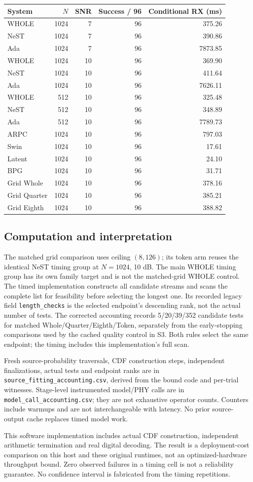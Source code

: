 \documentclass[10pt,letterpaper]{article}
\begin{document}
\begin{longtable}{@{}lrrrr@{}}\toprule
System & $N$ & SNR & Success / 96 & Conditional RX (ms)\\\midrule\endhead
WHOLE & 1024 & 7 & 96 & 375.26\\
NeST & 1024 & 7 & 96 & 390.86\\
Ada & 1024 & 7 & 96 & 7873.85\\
WHOLE & 1024 & 10 & 96 & 369.90\\
NeST & 1024 & 10 & 96 & 411.64\\
Ada & 1024 & 10 & 96 & 7626.11\\
WHOLE & 512 & 10 & 96 & 325.48\\
NeST & 512 & 10 & 96 & 348.89\\
Ada & 512 & 10 & 96 & 7789.73\\
ARPC & 1024 & 10 & 96 & 797.03\\
Swin & 1024 & 10 & 96 & 17.61\\
Latent & 1024 & 10 & 96 & 24.10\\
BPG & 1024 & 10 & 96 & 31.71\\
Grid Whole & 1024 & 10 & 96 & 378.16\\
Grid Quarter & 1024 & 10 & 96 & 385.21\\
Grid Eighth & 1024 & 10 & 96 & 388.82\\
\bottomrule\end{longtable}
\subsection{Computation and interpretation}
The matched grid comparison uses ceiling $(8,126)$; its token arm reuses the identical NeST timing group at $N=1024$, 10 dB. The main WHOLE timing group has its own family target and is not the matched-grid WHOLE control. The timed implementation constructs all candidate streams and scans the complete list for feasibility before selecting the longest one. Its recorded legacy field \texttt{length\_checks} is the selected endpoint's descending rank, not the actual number of tests. The corrected accounting records 5/20/39/352 candidate tests for matched Whole/Quarter/Eighth/Token, separately from the early-stopping comparisons used by the cached quality control in S3. Both rules select the same endpoint; the timing includes this implementation's full scan.

Fresh source-probability traversals, CDF construction steps, independent finalizations, actual tests and endpoint ranks are in \texttt{source\_fitting\_accounting.csv}, derived from the bound code and per-trial witnesses. Stage-level instrumented model/PHY calls are in \texttt{model\_call\_accounting.csv}; they are not exhaustive operator counts. Counters include warmups and are not interchangeable with latency. No prior source-output cache replaces timed model work.

This software implementation includes actual CDF construction, independent arithmetic termination and real digital decoding. The result is a deployment-cost comparison on this host and these original runtimes, not an optimized-hardware throughput bound. Zero observed failures in a timing cell is not a reliability guarantee. No confidence interval is fabricated from the timing repetitions.
\end{document}
